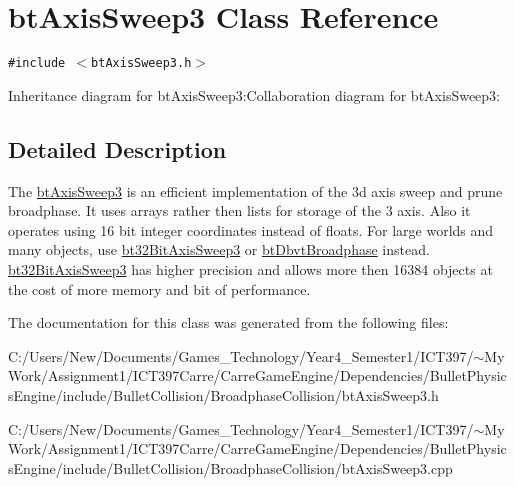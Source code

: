 \hypertarget{classbt_axis_sweep3}{
\section{btAxisSweep3 Class Reference}
\label{classbt_axis_sweep3}
}
{\tt \#include $<$btAxisSweep3.h$>$}

Inheritance diagram for btAxisSweep3:Collaboration diagram for btAxisSweep3:

\subsection{Detailed Description}
The \hyperlink{classbt_axis_sweep3}{btAxisSweep3} is an efficient implementation of the 3d axis sweep and prune broadphase. It uses arrays rather then lists for storage of the 3 axis. Also it operates using 16 bit integer coordinates instead of floats. For large worlds and many objects, use \hyperlink{classbt32_bit_axis_sweep3}{bt32BitAxisSweep3} or \hyperlink{structbt_dbvt_broadphase}{btDbvtBroadphase} instead. \hyperlink{classbt32_bit_axis_sweep3}{bt32BitAxisSweep3} has higher precision and allows more then 16384 objects at the cost of more memory and bit of performance. 

The documentation for this class was generated from the following files:\begin{CompactItemize}
\item 
C:/Users/New/Documents/Games\_\-Technology/Year4\_\-Semester1/ICT397/$\sim$My Work/Assignment1/ICT397Carre/CarreGameEngine/Dependencies/BulletPhysicsEngine/include/BulletCollision/BroadphaseCollision/btAxisSweep3.h\item 
C:/Users/New/Documents/Games\_\-Technology/Year4\_\-Semester1/ICT397/$\sim$My Work/Assignment1/ICT397Carre/CarreGameEngine/Dependencies/BulletPhysicsEngine/include/BulletCollision/BroadphaseCollision/btAxisSweep3.cpp\end{CompactItemize}
